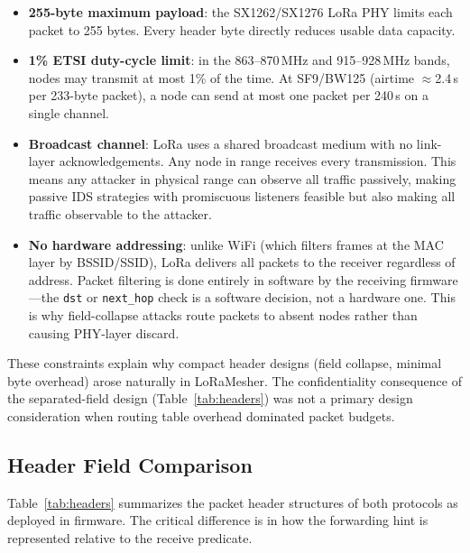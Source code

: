 \documentclass[journal]{IEEEtran}
\begin{document}
\begin{itemize}
  \item \textbf{255-byte maximum payload}: the SX1262/SX1276 LoRa PHY
    limits each packet to 255 bytes. Every header byte directly reduces
    usable data capacity.

  \item \textbf{1\% ETSI duty-cycle limit}: in the 863--870\,MHz and
    915--928\,MHz bands, nodes may transmit at most 1\% of the time.
    At SF9/BW125 (airtime $\approx$2.4\,s per 233-byte packet), a node
    can send at most one packet per 240\,s on a single channel.

  \item \textbf{Broadcast channel}: LoRa uses a shared broadcast
    medium with no link-layer acknowledgements. Any node in range
    receives every transmission. This means any attacker in physical
    range can observe all traffic passively, making passive IDS
    strategies with promiscuous listeners feasible but also making
    all traffic observable to the attacker.

  \item \textbf{No hardware addressing}: unlike WiFi (which filters
    frames at the MAC layer by BSSID/SSID), LoRa delivers all packets
    to the receiver regardless of address. Packet filtering is done
    entirely in software by the receiving firmware---the \texttt{dst} or
    \texttt{next\_hop} check is a software decision, not a hardware one.
    This is why field-collapse attacks route packets to absent nodes
    rather than causing PHY-layer discard.
\end{itemize}

These constraints explain why compact header designs (field collapse,
minimal byte overhead) arose naturally in LoRaMesher. The
confidentiality consequence of the separated-field design
(Table~\ref{tab:headers}) was not a primary design consideration when
routing table overhead dominated packet budgets.

\subsection{Header Field Comparison}

Table~\ref{tab:headers} summarizes the packet header structures of both
protocols as deployed in firmware. The critical difference is in how the
forwarding hint is represented relative to the receive predicate.
\end{document}
